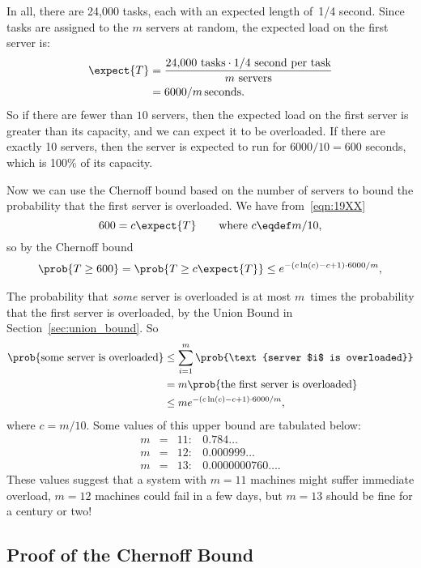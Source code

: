 In all, there are 24,000 tasks, each with an expected length of~1/4
second.  Since tasks are assigned to the $m$ servers at random, the
expected load on the first server is:
\begin{align}
\expect{T} & = \frac{24{,}000 \mbox{ tasks} \cdot 1/4 \mbox{ second per task}}
  {m \mbox{ servers}} \notag\\
  & = 6000 / m\,\text{seconds}.
\label{eqn:19XX}
\end{align}
So if there are fewer than $10$ servers, then the expected
load on the first server is greater than its capacity, and we can
expect it to be overloaded.  If there are exactly 10 servers, then the
server is expected to run for $6000/10 = 600$ seconds, which is 100\%
of its capacity.

Now we can use the Chernoff bound based on the number of servers to
bound the probability that the first server is overloaded.  We have
from~\eqref{eqn:19XX}
\[
600 = c \expect{T}  \qquad \text{where } c \eqdef m/10,
\]
so by the Chernoff bound
\begin{align*}
\prob{T \geq 600} = \prob{T \geq c \expect{T}} \leq e^{-(c \ln(c) - c + 1) \cdot 6000 / m},
\end{align*}

The probability that \emph{some} server is overloaded is at most
$m$~times the probability that the first server is overloaded, by the
Union Bound in Section~\ref{sec:union_bound}.  So
\begin{align*}
\prob{\text{some server is overloaded}}
    &\le \sum_{i = 1}^m \prob{\text{server $i$ is overloaded}} \\
    &= m \prob{\text{the first server is overloaded}} \\
    &\leq m e^{-(c \ln(c) - c + 1) \cdot 6000 / m},
\end{align*}
where $c = m/10$.  Some values of this upper bound are tabulated below:
\[
\begin{array}{rcll}
m & = & 11: & 0.784\dots \\
m & = & 12: & 0.000999\dots \\
m & = & 13: & 0.0000000760\dots .
\end{array}
\]
These values suggest that a system with $m = 11$ machines might suffer
immediate overload, $m = 12$ machines could fail in a few days, but $m
= 13$ should be fine for a century or two!

\subsection{Proof of the Chernoff Bound}\label{sec:chernoff_proof}

